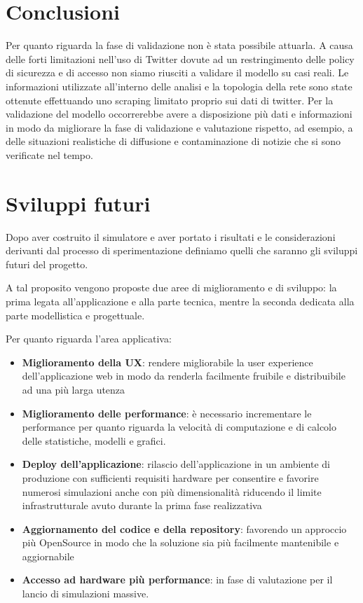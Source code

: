 \documentclass[11pt]{article}
\begin{document}
\section{Conclusioni}

Per quanto riguarda la fase di validazione non è stata possibile attuarla. A causa delle forti limitazioni nell'uso di Twitter dovute ad un restringimento delle policy di sicurezza e di accesso non siamo riusciti a validare il modello su casi reali. Le informazioni utilizzate all'interno delle analisi e la topologia della rete sono state ottenute effettuando uno scraping limitato proprio sui dati di twitter. Per la validazione del modello occorrerebbe avere a disposizione più dati e informazioni in modo da migliorare la fase di validazione e valutazione rispetto, ad esempio, a delle situazioni realistiche di diffusione e contaminazione di notizie che si sono verificate nel tempo.


\section{Sviluppi futuri}

Dopo aver costruito il simulatore e aver portato i risultati e le considerazioni derivanti dal processo di sperimentazione definiamo quelli che saranno gli sviluppi futuri del progetto.

A tal proposito vengono proposte due aree di miglioramento e di sviluppo: la prima legata all'applicazione e alla parte tecnica, mentre la seconda dedicata alla parte modellistica e progettuale.

Per quanto riguarda l'area applicativa:
\begin{itemize}
    \item \textbf{Miglioramento della UX}: rendere migliorabile la user experience dell'applicazione web in modo da renderla facilmente fruibile e distribuibile ad una più larga utenza
    \item \textbf{Miglioramento delle performance}:  è necessario incrementare le performance per quanto riguarda la velocità di computazione e di calcolo delle statistiche, modelli e grafici.
    \item \textbf{Deploy dell'applicazione}: rilascio dell'applicazione in un ambiente di produzione con sufficienti requisiti hardware per consentire e favorire numerosi simulazioni anche con più dimensionalità riducendo il limite infrastrutturale avuto durante la prima fase realizzativa
    \item \textbf{Aggiornamento del codice e della repository}: favorendo un approccio più OpenSource in modo che la soluzione sia più facilmente mantenibile e aggiornabile
    \item \textbf{Accesso ad hardware più performance}: in fase di valutazione per il lancio di simulazioni massive.
\end{itemize}
\end{document}
